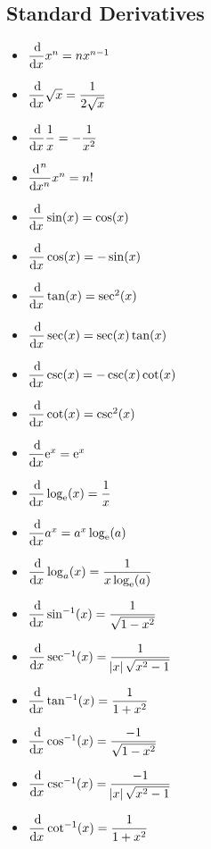 \documentclass[14]{article}
\theoremstyle{definition}
\theoremstyle{case}
\begin{document}
\subsection{Standard Derivatives}
\begin{itemize}
\item $ \dfrac{\dif}{\dif x} x^n = nx^{n-1} $
\item $\dfrac{\dif}{\dif x} \sqrt{x} = \dfrac{1}{2 \sqrt{x}}$
\item $\dfrac{\dif}{\dif x} \dfrac{1}{x} = -\dfrac{1}{x^2}$
\item $\dfrac{\dif^{\;n}}{\dif x^n} x^n = n!$
\item $\dfrac{\dif}{\dif x} \sin(x) = \cos(x)$
\item $\dfrac{\dif}{\dif x} \cos(x) = -\sin(x)$
\item $\dfrac{\dif}{\dif x} \tan(x) = \sec^2(x)$
\item $\dfrac{\dif}{\dif x} \sec(x) = \sec(x) \tan(x)$
\item $\dfrac{\dif}{\dif x} \csc(x) = -\csc(x) \cot(x)$
\item $\dfrac{\dif}{\dif x} \cot(x) = \csc^2(x)$
\item $\dfrac{\dif}{\dif x} {\rm e}^x ={\rm e}^x$
\item $\dfrac{\dif}{\dif x} \log_{\rm e}(x) = \dfrac{1}{x}$
\item $\dfrac{\dif}{\dif x} a^x = a^x \log_{\rm e}(a)$
\item $\dfrac{\dif}{\dif x} \log_a(x) = \dfrac{1}{x \log_{\rm e}(a)}$
\item $\dfrac{\dif}{\dif x} \sin^{-1}(x) = \dfrac{1}{\sqrt{1 - x^2}}$
\item $\dfrac{\dif}{\dif x} \sec^{-1}(x) = \dfrac{1}{\abs{x} \sqrt{x^2 - 1}}$
\item $\dfrac{\dif}{\dif x} \tan^{-1}(x) = \dfrac{1}{1 + x^2}$
\item $\dfrac{\dif}{\dif x} \cos^{-1}(x) = \dfrac{-1}{\sqrt{1 - x^2}}$
\item $\dfrac{\dif}{\dif x} \csc^{-1}(x) = \dfrac{-1}{\abs{x} \sqrt{x^2 - 1}}$
\item $\dfrac{\dif}{\dif x} \cot^{-1}(x) = \dfrac{1}{1 + x^2}$
\end{itemize}
\pagebreak
\end{document}
